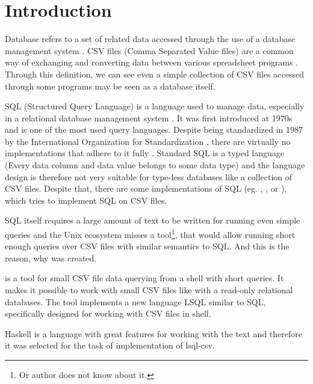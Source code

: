 \chapter*{Introduction}

Database refers to a set of related data accessed through the use of a database management system \cite{enwiki-database}.
CSV files (Comma Separated Value files) are a common way of exchanging and converting data between various spreadsheet programs \cite{rfc4180}.
Through this definition, we can see even a simple collection of CSV files accessed through some programs may be seen as a database itself.


SQL (Structured Query Language) is a language used to manage data, especially in a relational database management system \cite{enwiki-sql}.
It was first introduced at 1970s \cite{enwiki-sql} and is one of the most used query languages. 
Despite being standardized in 1987 by the International Organization for Standardization \cite{ISO9075-1987}, 
there are virtually no implementations that adhere to it fully \cite{enwiki-sql}.
Standard SQL is a typed language (Every data column and data value belongs to some data type) \cite{ISO9075-2023} and the language
design is therefore not very suitable for type-less databases like a collection of CSV files.
Despite that, there are some implementations of SQL (eg.  \cite{q},  \cite{csv-sql},  \cite{trdsql} or  \cite{csvq}), which tries to implement SQL on CSV files.

SQL itself requires a large amount of text to be written for running even simple queries and the Unix ecosystem misses a tool\footnote{Or author does not know about it.}, 
that would allow running short enough queries over CSV files with similar semantics to SQL. And this is the reason, why  was created.

 is a tool for small CSV file data querying from a shell with short queries. It makes it possible to work with small CSV files like with a read-only relational databases.
The tool implements a new language LSQL similar to SQL, specifically designed for working with CSV files in shell.

Haskell is a language with great features for working with the text \cite{practical-haskell} and therefore it was selected for the task of implementation of lsql-csv.
